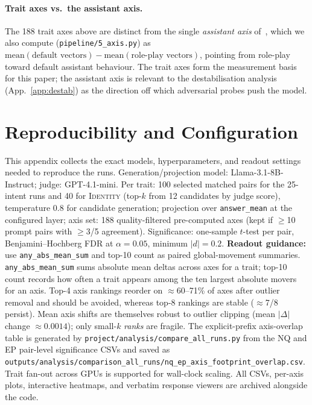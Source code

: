 \documentclass{article}
\newcommand{\ax}[1]{\texttt{#1}}   %
\begin{document}
\paragraph{Trait axes vs.\ the assistant axis.} The 188 trait axes above are distinct from the single \emph{assistant axis} of~\cite{assistantaxis}, which we also compute (\texttt{pipeline/5\_axis.py}) as $\text{mean}(\text{default vectors}) - \text{mean}(\text{role-play vectors})$, pointing from role-play toward default assistant behaviour. The trait axes form the measurement basis for this paper; the assistant axis is relevant to the destabilisation analysis (App.~\ref{app:destab}) as the direction off which adversarial probes push the model.

\section{Reproducibility and Configuration}
\label{app:repro}

This appendix collects the exact models, hyperparameters, and readout settings needed to reproduce the runs. Generation/projection model: \mbox{Llama-3.1-8B-Instruct}; judge: GPT-4.1-mini. Per trait: 100 selected matched pairs for the 25-intent runs and 40 for \textsc{Identity} (top-$k$ from 12 candidates by judge score), temperature $0.8$ for candidate generation; projection over \ax{answer\_mean} at the configured layer; axis set: 188 quality-filtered pre-computed axes (kept if $\geq$10 prompt pairs with $\geq$3/5 agreement). Significance: one-sample $t$-test per pair, Benjamini--Hochberg FDR at $\alpha=0.05$, minimum $|d|=0.2$. \textbf{Readout guidance:} use \ax{any\_abs\_mean\_sum} and top-10 count as paired global-movement summaries. \ax{any\_abs\_mean\_sum} sums absolute mean deltas across axes for a trait; top-10 count records how often a trait appears among the ten largest absolute movers for an axis. Top-4 axis rankings reorder on $\approx$60--71\% of axes after outlier removal and should be avoided, whereas top-8 rankings are stable ($\approx$7/8 persist). Mean axis shifts are themselves robust to outlier clipping (mean $|\Delta|$ change $\approx0.0014$); only small-$k$ \emph{ranks} are fragile. The explicit-prefix axis-overlap table is generated by \texttt{project/analysis/compare\_all\_runs.py} from the NQ and EP pair-level significance CSVs and saved as \texttt{outputs/analysis/comparison\_all\_runs/nq\_ep\_axis\_footprint\_overlap.csv}. Trait fan-out across GPUs is supported for wall-clock scaling. All CSVs, per-axis plots, interactive heatmaps, and verbatim response viewers are archived alongside the code.
\end{document}
